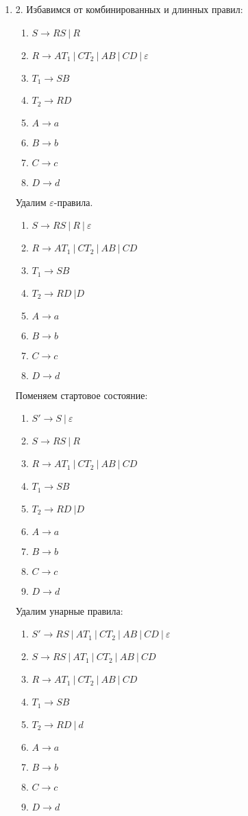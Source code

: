 \documentclass[12pt]{article}
\newenvironment{MyList}[1][4pt]{
  \begin{enumerate}[1.]
  \setlength{\parskip}{0pt}
  \setlength{\itemsep}{#1}
}{       
  \end{enumerate}
}
\begin{document}
\begin{MyList}
	\item[2.]
	Избавимся от комбинированных и длинных правил:
	\begin{MyList}
		\item $S \to RS \ | \ R$
		\item $R \to AT_1 \ | \ CT_2 \ | \ AB \ | \ CD \ | \ \varepsilon$
		\item $T_1 \to SB$
		\item $T_2 \to RD$
		\item $A \to a$
		\item $B \to b$
		\item $C \to c$
		\item $D \to d$
	\end{MyList}
	
	Удалим $\varepsilon$-правила.
	\begin{MyList}
		\item $S \to RS \ | \ R \ | \ \varepsilon$
		\item $R \to AT_1 \ | \ CT_2 \ | \ AB \ | \ CD $
		\item $T_1 \to SB$
		\item $T_2 \to RD \ | D$
		\item $A \to a$
		\item $B \to b$
		\item $C \to c$
		\item $D \to d$
	\end{MyList}
	
	Поменяем стартовое состояние:
	\begin{MyList}
		\item $S' \to S \ | \ \varepsilon$
		\item $S \to RS \ | \ R$
		\item $R \to AT_1 \ | \ CT_2 \ | \ AB \ | \ CD $
		\item $T_1 \to SB$
		\item $T_2 \to RD \ | D$
		\item $A \to a$
		\item $B \to b$
		\item $C \to c$
		\item $D \to d$
	\end{MyList}
	
	Удалим унарные правила:
	\begin{MyList}
		\item $S' \to RS \ | \ AT_1 \ | \ CT_2 \ | \ AB \ | \ CD \ | \ \varepsilon$
		\item $S \to RS \ | \ AT_1 \ | \ CT_2 \ | \ AB \ | \ CD $
		\item $R \to AT_1 \ | \ CT_2 \ | \ AB \ | \ CD $
		\item $T_1 \to SB$
		\item $T_2 \to RD \ | \ d$
		\item $A \to a$
		\item $B \to b$
		\item $C \to c$
		\item $D \to d$
	\end{MyList}
	

\end{MyList}
\end{document}
